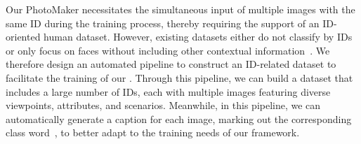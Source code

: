 Our PhotoMaker necessitates the simultaneous input of multiple images with the same ID during the training process, thereby requiring the support of an ID-oriented human dataset.
However, existing datasets either do not classify by IDs~\cite{karras2019style, schuhmann2022laion, zheng2022general, liu2023hyperhuman} or only focus on faces without including other contextual information~\cite{liu2015faceattributes, kaisiyuan2020mead, nitzan2022mystyle}.
We therefore design an automated pipeline to construct an ID-related dataset to facilitate the training of our \methodname. 
Through this pipeline, we can build a dataset that includes a large number of IDs, each with multiple images featuring diverse viewpoints, attributes, and scenarios. 
Meanwhile, in this pipeline, we can automatically generate a caption for each image, marking out the corresponding class word~\cite{ruiz2022dreambooth}, to better adapt to the training needs of our framework.








